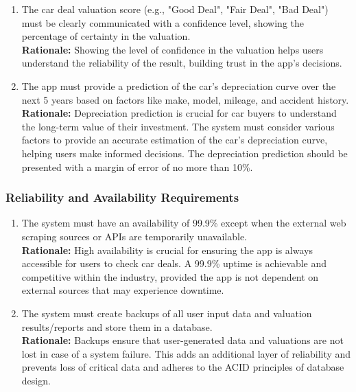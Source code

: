 \documentclass[]{article}
\begin{document}
\begin{enumerate}
\begin{enumerate}[{PR-PA}1.]
    \item The car deal valuation score (e.g., "Good Deal", "Fair Deal", "Bad Deal") must be clearly communicated with a confidence level, showing the percentage of certainty in the valuation.  \\
    \textbf{Rationale:} Showing the level of confidence in the valuation helps users understand the reliability of the result, building trust in the app's decisions.

    \item The app must provide a prediction of the car's depreciation curve over the next 5 years based on factors like make, model, mileage, and accident history.  \\
    \textbf{Rationale:} Depreciation prediction is crucial for car buyers to understand the long-term value of their investment. The system must consider various factors to provide an accurate estimation of the car's depreciation curve, helping users make informed decisions. The depreciation prediction should be presented with a margin of error of no more than 10\%.
\end{enumerate}

\subsubsection{Reliability and Availability Requirements}
\label{ssub:reliability_and_availability_requirements}
\begin{enumerate}[{PR-RA}1.]
    \item The system must have an availability of 99.9\% except when the external web scraping sources or APIs are temporarily unavailable.  \\
    \textbf{Rationale:} High availability is crucial for ensuring the app is always accessible for users to check car deals. A 99.9\% uptime is achievable and competitive within the industry, provided the app is not dependent on external sources that may experience downtime. 

    \item The system must create backups of all user input data and valuation results/reports and store them in a database.  \\
    \textbf{Rationale:} Backups ensure that user-generated data and valuations are not lost in case of a system failure. This adds an additional layer of reliability and prevents loss of critical data and adheres to the ACID principles of database design.
\end{enumerate}


\end{enumerate}
\end{document}
